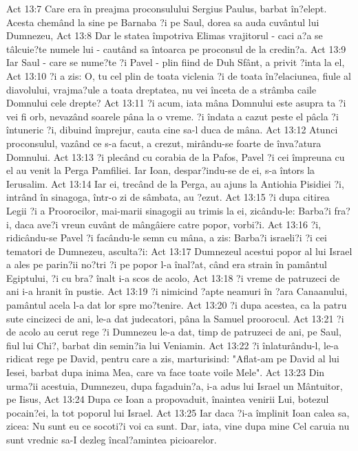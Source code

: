 Act 13:7  Care era în preajma proconsulului Sergius Paulus, barbat în?elept. Acesta chemând la sine pe Barnaba ?i pe Saul, dorea sa auda cuvântul lui Dumnezeu,
Act 13:8  Dar le statea împotriva Elimas vrajitorul - caci a?a se tâlcuie?te numele lui - cautând sa întoarca pe proconsul de la credin?a.
Act 13:9  Iar Saul - care se nume?te ?i Pavel - plin fiind de Duh Sfânt, a privit ?inta la el,
Act 13:10  ?i a zis: O, tu cel plin de toata viclenia ?i de toata în?elaciunea, fiule al diavolului, vrajma?ule a toata dreptatea, nu vei înceta de a strâmba caile Domnului cele drepte?
Act 13:11  ?i acum, iata mâna Domnului este asupra ta ?i vei fi orb, nevazând soarele pâna la o vreme. ?i îndata a cazut peste el pâcla ?i întuneric ?i, dibuind împrejur, cauta cine sa-l duca de mâna.
Act 13:12  Atunci proconsulul, vazând ce s-a facut, a crezut, mirându-se foarte de înva?atura Domnului.
Act 13:13  ?i plecând cu corabia de la Pafos, Pavel ?i cei împreuna cu el au venit la Perga Pamfiliei. Iar Ioan, despar?indu-se de ei, s-a întors la Ierusalim.
Act 13:14  Iar ei, trecând de la Perga, au ajuns la Antiohia Pisidiei ?i, intrând în sinagoga, într-o zi de sâmbata, au ?ezut.
Act 13:15  ?i dupa citirea Legii ?i a Proorocilor, mai-marii sinagogii au trimis la ei, zicându-le: Barba?i fra?i, daca ave?i vreun cuvânt de mângâiere catre popor, vorbi?i.
Act 13:16  ?i, ridicându-se Pavel ?i facându-le semn cu mâna, a zis: Barba?i israeli?i ?i cei tematori de Dumnezeu, asculta?i:
Act 13:17  Dumnezeul acestui popor al lui Israel a ales pe parin?ii no?tri ?i pe popor l-a înal?at, când era strain în pamântul Egiptului, ?i cu bra? înalt i-a scos de acolo,
Act 13:18  ?i vreme de patruzeci de ani i-a hranit în pustie.
Act 13:19  ?i nimicind ?apte neamuri în ?ara Canaanului, pamântul acela l-a dat lor spre mo?tenire.
Act 13:20  ?i dupa acestea, ca la patru sute cincizeci de ani, le-a dat judecatori, pâna la Samuel proorocul.
Act 13:21  ?i de acolo au cerut rege ?i Dumnezeu le-a dat, timp de patruzeci de ani, pe Saul, fiul lui Chi?, barbat din semin?ia lui Veniamin.
Act 13:22  ?i înlaturându-l, le-a ridicat rege pe David, pentru care a zis, marturisind: "Aflat-am pe David al lui Iesei, barbat dupa inima Mea, care va face toate voile Mele".
Act 13:23  Din urma?ii acestuia, Dumnezeu, dupa fagaduin?a, i-a adus lui Israel un Mântuitor, pe Iisus,
Act 13:24  Dupa ce Ioan a propovaduit, înaintea venirii Lui, botezul pocain?ei, la tot poporul lui Israel.
Act 13:25  Iar daca ?i-a împlinit Ioan calea sa, zicea: Nu sunt eu ce socoti?i voi ca sunt. Dar, iata, vine dupa mine Cel caruia nu sunt vrednic sa-I dezleg încal?amintea picioarelor.
